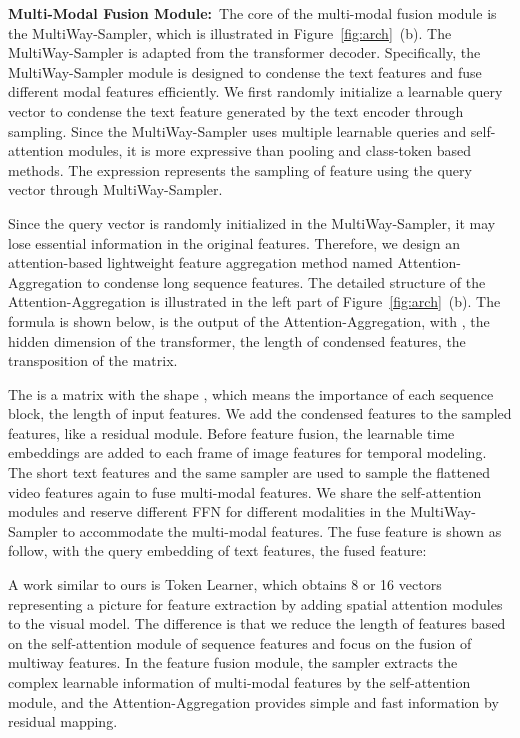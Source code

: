 \documentclass[10pt,twocolumn,letterpaper]{article}
\begin{document}
\textbf{Multi-Modal Fusion Module:}~The core of the multi-modal fusion module is the MultiWay-Sampler, which is illustrated in Figure~\ref{fig:arch}~(b). The MultiWay-Sampler is adapted from the transformer decoder. Specifically, the MultiWay-Sampler module is designed to condense the text features and fuse different modal features efficiently. 
We first randomly initialize a learnable query vector to condense the text feature generated by the text encoder through sampling. 
Since the MultiWay-Sampler uses multiple learnable queries and self-attention modules, it is more expressive than pooling and class-token based methods. 
The expression  represents the sampling of feature  using the query vector  through MultiWay-Sampler.

Since the query vector is randomly initialized in the MultiWay-Sampler, it may lose essential information in the original features.
Therefore, we design an attention-based lightweight feature aggregation method named Attention-Aggregation to condense long sequence features. 
The detailed structure of the Attention-Aggregation is illustrated in the left part of Figure~\ref{fig:arch}~(b). 
The formula is shown below,  is the output of the Attention-Aggregation, with ,  the hidden dimension of the transformer,  the length of condensed features,  the transposition of the matrix. 
\vspace{-1ex}

\vspace{-3.5ex}

The  is a matrix with the shape , which means the importance of each sequence block,  the length of input features. We add the condensed features to the sampled features, like a residual module. 
Before feature fusion, the learnable time embeddings are added to each frame of image features for temporal modeling. 
The short text features and the same sampler are used to sample the flattened video features again to fuse multi-modal features. 
We share the self-attention modules and reserve different FFN for different modalities in the MultiWay-Sampler to accommodate the multi-modal features.
The fuse feature is shown as follow, with  the query embedding of text features,  the fused feature:
\vspace{-1ex}

\vspace{-3.5ex}

A work similar to ours is Token Learner, which obtains 8 or 16 vectors representing a picture for feature extraction by adding spatial attention modules to the visual model. 
The difference is that we reduce the length of features based on the self-attention module of sequence features and focus on the fusion of multiway features. In the feature fusion module, the sampler extracts the complex learnable information of multi-modal features by the self-attention module, and the Attention-Aggregation provides simple and fast information by residual mapping.
\end{document}

